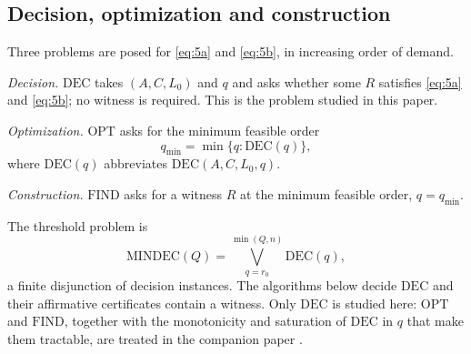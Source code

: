 \documentclass[journal]{IEEEtran}
\theoremstyle{plainn}
\theoremstyle{remark}
\begin{document}
\subsection{Decision, optimization and construction}\label{sec:problems}

Three problems are posed for \eqref{eq:5a} and \eqref{eq:5b}, in increasing order of
demand.

\emph{Decision.} $\mathrm{DEC}$ takes $(A,C,L_0)$ and $q$ and asks whether some $R$
satisfies \eqref{eq:5a} and \eqref{eq:5b}; no witness is required. This is the problem
studied in this paper.

\emph{Optimization.} $\mathrm{OPT}$ asks for the minimum feasible order
\begin{equation*}
q_{\min}=\min\{q:\mathrm{DEC}(q)\},
\end{equation*}
where $\mathrm{DEC}(q)$ abbreviates $\mathrm{DEC}(A,C,L_0,q)$.

\emph{Construction.} $\mathrm{FIND}$ asks for a witness $R$ at the minimum feasible
order, $q=q_{\min}$.

The threshold problem is
\begin{equation}\label{eq:mindec}
\mathrm{MINDEC}(Q)=\bigvee_{q=r_0}^{\min(Q,n)}\mathrm{DEC}(q),
\end{equation}
a finite disjunction of decision instances. The algorithms below decide $\mathrm{DEC}$ and their
affirmative certificates contain a witness. Only $\mathrm{DEC}$ is studied here: $\mathrm{OPT}$ and
$\mathrm{FIND}$, together with the monotonicity and saturation of $\mathrm{DEC}$ in $q$ that make them
tractable, are treated in the companion paper \cite{companion2}.
\end{document}
